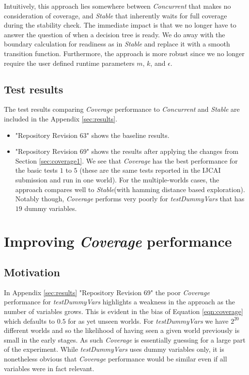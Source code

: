\documentclass[a4paper]{article}
\newcommand{\cc}{\emph{Concurrent}\xspace}
\newcommand{\st}{\emph{Stable}\xspace}
\newcommand{\cov}{\emph{Coverage}\xspace}
\newcommand{\dt}{{decision tree}\xspace}
\begin{document}
Intuitively, this approach lies somewhere between \cc that makes no consideration of coverage, and \st that inherently waits for full coverage during the stability check. The immediate impact is that we no longer have to answer the question of when a \dt is ready. We do away with the boundary calculation for readiness as in \st and replace it with a smooth transition function. Furthermore, the approach is more robust since we no longer require the user defined runtime parameters  $m$, $k$, and $\epsilon$.

\subsection{Test results}
The test results comparing \cov performance to \cc and \st are included in the Appendix \ref{sec:results}.
\begin{itemize}
\item "Repository Revision 63" shows the baseline results.
\item "Repository Revision 69" shows the results after applying the changes from Section \ref{sec:coverage1}. We see that \cov has the best performance for the basic tests $1$ to $5$ (these are the same tests reported in the IJCAI submission and run in one world). For the multiple-worlds cases, the approach compares well to \st (with hamming distance based exploration). Notably though, \cov performs very poorly for \textit{testDummyVars} that has $19$ dummy variables.
\end{itemize}

\section{Improving {\cov} performance}
\label{sec:coverage2}

\subsection{Motivation}
\label{subsec:coverage2-motivation}

In Appendix \ref{sec:results} "Repository Revision 69" the poor \cov performance for \textit{testDummyVars} highlights a weakness in the approach as the number of variables grows. This is evident in the bias of Equation \ref{eqn:coverage} which defaults to $0.5$ for as yet unseen worlds. For \textit{testDummyVars} we have $2^{20}$ different worlds and so the likelihood of having seen a given world previously is small in the early stages. As such \cov is essentially guessing for a large part of the experiment. While \textit{testDummyVars} uses dummy variables only, it is nonetheless obvious that \cov performance would be similar even if all variables were in fact relevant.
\end{document}
